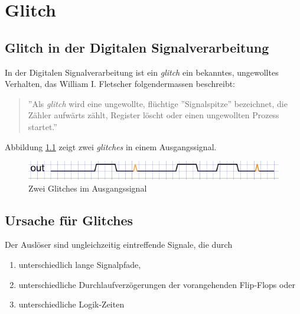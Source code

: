 
\chapter{Glitch}\label{chap.glitch}

\section{Glitch in der Digitalen Signalverarbeitung}\label{sect.glitch_def}
In der Digitalen Signalverarbeitung ist ein \textit{glitch} ein bekanntes, ungewolltes Verhalten, das William I. Fletscher folgendermassen beschreibt:

\begin{quote}
''Als \textit{glitch}  wird eine ungewollte, flüchtige ''Signalspitze'' bezeichnet, die Zähler aufwärts zählt, Register löscht oder einen ungewollten Prozess startet.''  \citep{F_glitches}
\end{quote}


Abbildung \ref{fig.glitch.def} zeigt zwei \textit{glitches} in einem Ausgangssignal.

\begin{figure}[H]
	\includegraphics[width=\textwidth]{images/glitch/def_glitch_1.png}
	\caption{Zwei Glitches im Ausgangssignal}
	\label{fig.glitch.def}
\end{figure}


\section{Ursache für Glitches}\label{sect.glitch_ursache}

Der Auslöser sind ungleichzeitig eintreffende Signale, die durch

\begin{enumerate}
\item unterschiedlich lange Signalpfade,
\item unterschiedliche Durchlaufverzögerungen der vorangehenden Flip-Flops oder
\item unterschiedliche Logik-Zeiten
\end{enumerate}

